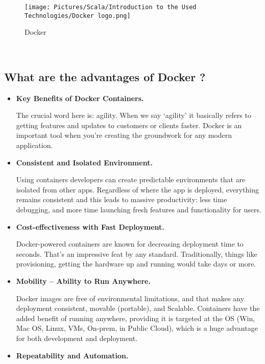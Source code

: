 \begin{spacing}{1.5}
\begin{figure}[!htb] 
\begin{center} 
\texttt{[image: Pictures/Scala/Introduction to the Used Technologies/Docker logo.png]}
\end{center} 
\caption{Docker} 
\end{figure}  \FloatBarrier
\\

\subsection{What are the advantages of Docker ?}
\begin{itemize}
   \item \textbf{Key Benefits of Docker Containers.}
    
    The crucial word here is: agility. When we say ‘agility’ it basically refers to getting features and updates to customers or clients faster. Docker is an important tool when you’re creating the groundwork for any modern application. \vspace{.25cm}
   \item \textbf{Consistent and Isolated Environment.}
    
    Using containers developers can create predictable environments that are isolated from other apps. Regardless of where the app is deployed, everything remains consistent and this leads to massive productivity: less time debugging, and more time launching fresh features and functionality for users.\vspace{.25cm}
   \item \textbf{Cost-effectiveness with Fast Deployment.}
    
    Docker-powered containers are known for decreasing deployment time to seconds. That’s an impressive feat by any standard. Traditionally, things like provisioning, getting the hardware up and running would take days or more.\vspace{.25cm}
   \item \textbf{Mobility – Ability to Run Anywhere.}
    
    Docker images are free of environmental limitations, and that makes any deployment consistent, movable (portable), and Scalable. Containers have the added benefit of running anywhere, providing it is targeted at the OS (Win, Mac OS, Linux, VMs, On-prem, in Public Cloud), which is a huge advantage for both development and deployment. \vspace{.25cm}
   \item \textbf{Repeatability and Automation.}
    

\end{itemize}
\end{spacing}
